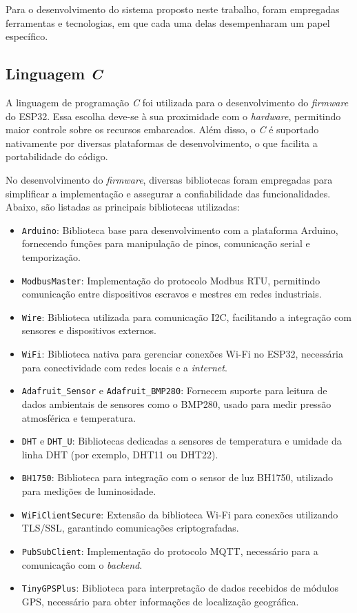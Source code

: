 Para o desenvolvimento do sistema proposto neste trabalho, foram empregadas ferramentas e tecnologias, em que cada uma delas desempenharam um papel específico.

\subsection{Linguagem \textit{C}}
A linguagem de programação \textit{C} foi utilizada para o desenvolvimento do \textit{firmware} do ESP32. Essa escolha deve-se à sua proximidade com o \textit{hardware}, permitindo maior controle sobre os recursos embarcados. Além disso, o \textit{C} é suportado nativamente por diversas plataformas de desenvolvimento, o que facilita a portabilidade do código.

No desenvolvimento do \textit{firmware}, diversas bibliotecas foram empregadas para simplificar a implementação e assegurar a confiabilidade das funcionalidades. Abaixo, são listadas as principais bibliotecas utilizadas:

\begin{itemize}
    \item \texttt{Arduino}: Biblioteca base para desenvolvimento com a plataforma Arduino, fornecendo funções para manipulação de pinos, comunicação serial e temporização.
    \item \texttt{ModbusMaster}: Implementação do protocolo Modbus RTU, permitindo comunicação entre dispositivos escravos e mestres em redes industriais.
    \item \texttt{Wire}: Biblioteca utilizada para comunicação I2C, facilitando a integração com sensores e dispositivos externos.
    \item \texttt{WiFi}: Biblioteca nativa para gerenciar conexões Wi-Fi no ESP32, necessária para conectividade com redes locais e a \textit{internet}.
    \item \texttt{Adafruit\_Sensor} e \texttt{Adafruit\_BMP280}: Fornecem suporte para leitura de dados ambientais de sensores como o BMP280, usado para medir pressão atmosférica e temperatura.
    \item \texttt{DHT} e \texttt{DHT\_U}: Bibliotecas dedicadas a sensores de temperatura e umidade da linha DHT (por exemplo, DHT11 ou DHT22).
    \item \texttt{BH1750}: Biblioteca para integração com o sensor de luz BH1750, utilizado para medições de luminosidade.
    \item \texttt{WiFiClientSecure}: Extensão da biblioteca Wi-Fi para conexões utilizando TLS/SSL, garantindo comunicações criptografadas.
    \item \texttt{PubSubClient}: Implementação do protocolo MQTT, necessário para a comunicação com o \textit{backend}.
    \item \texttt{TinyGPSPlus}: Biblioteca para interpretação de dados recebidos de módulos GPS, necessário para obter informações de localização geográfica.
\end{itemize}

